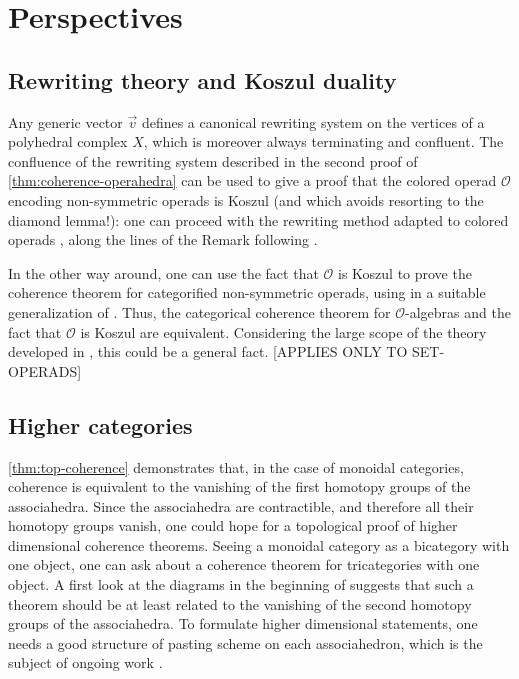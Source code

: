 
\section{Perspectives}




\subsection{Rewriting theory and Koszul duality}
Any generic vector $\vec v$ defines a canonical rewriting system on the vertices of a polyhedral complex $X$, which is moreover always terminating and confluent. 
The confluence of the rewriting system described in the second proof of \cref{thm:coherence-operahedra} can be used to give a proof that the colored operad $\mathcal{O}$ \cite[Definition 4.2]{laplante-anfossiDiagonalOperahedra2022a} encoding non-symmetric operads is Koszul (and which avoids resorting to the diamond lemma!): one can proceed with the rewriting method \cite[Section 8.3]{LodayVallette12} adapted to colored operads \cite{KhariKhoro20}, along the lines of the Remark following \cite[Theorem 9.1.5]{LodayVallette12}. 

In the other way around, one can use the fact that $\mathcal{O}$ is Koszul to prove the coherence theorem for categorified non-symmetric operads, using \cite[Theorem 15]{marklCoherenceConstraintsOperads2001} in a suitable generalization of \cite[Example 16]{marklCoherenceConstraintsOperads2001}.
Thus, the categorical coherence theorem for $\mathcal{O}$-algebras and the fact that $\mathcal{O}$ is Koszul are equivalent.
Considering the large scope of the theory developed in \cite{marklCoherenceConstraintsOperads2001}, this could be a general fact. [APPLIES ONLY TO SET-OPERADS]


\subsection{Higher categories} 
\label{sec:higher}
\cref{thm:top-coherence} demonstrates that, in the case of monoidal categories, coherence is equivalent to the vanishing of the first homotopy groups of the associahedra. 
Since the associahedra are contractible, and therefore all their homotopy groups vanish, one could hope for a topological proof of higher dimensional coherence theorems.
Seeing a monoidal category as a bicategory with one object, one can ask about a coherence theorem for tricategories with one object. 
A first look at the diagrams in the beginning of \cite[Section 2]{gordonCoherenceTricategories1995} suggests that such a theorem should be at least related to the vanishing of the second homotopy groups of the associahedra.  
To formulate higher dimensional statements, one needs a good structure of pasting scheme on each associahedron, which is the subject of ongoing work \cite{AMMLA}. 

